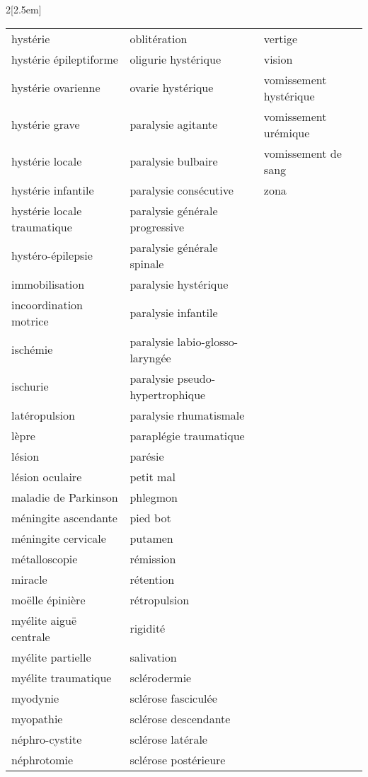 \begin{multicols}{2}[\columnsep2.5em] 
\begin{table}[H]
\footnotesize
\begin{tabular}{l|l|l}
hystérie & oblitération & vertige \\
hystérie épileptiforme & oligurie hystérique & vision \\
hystérie ovarienne & ovarie hystérique & vomissement hystérique\\
hystérie grave &  paralysie agitante & vomissement urémique\\
hystérie locale & paralysie bulbaire &  vomissement de sang\\
hystérie infantile & paralysie consécutive & zona\\
hystérie locale traumatique & paralysie générale progressive & \\
hystéro-épilepsie & paralysie générale spinale & \\
immobilisation & paralysie hystérique & \\
incoordination motrice & paralysie infantile & \\
ischémie & paralysie labio-glosso-laryngée & \\
ischurie & paralysie pseudo-hypertrophique & \\
latéropulsion & paralysie rhumatismale &  \\
lèpre & paraplégie traumatique & \\
lésion & parésie & \\
lésion oculaire & petit mal & \\
maladie de Parkinson & phlegmon & \\
méningite ascendante & pied bot & \\
méningite cervicale & putamen & \\
métalloscopie &  rémission &\\
miracle &  rétention & \\
moëlle épinière &  rétropulsion & \\
myélite aiguë centrale & rigidité & \\
myélite partielle & salivation &  \\
myélite traumatique & sclérodermie &  \\
myodynie & sclérose fasciculée & \\
myopathie & sclérose descendante & \\
néphro-cystite & sclérose latérale & \\
néphrotomie & sclérose postérieure & \\

\end{tabular}
\end{table}
\end{multicols}
